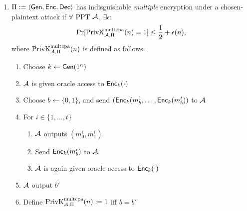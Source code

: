 \begin{solution}
\begin{enumerate}
    \item
      $\Pi := \langle\operatorname{\mathsf{Gen}}, \operatorname{\mathsf{Enc}}, \operatorname{\mathsf{Dec}}\rangle$ has indisguishable \emph{multiple} encryption under a chosen-plaintext attack
      if $\forall$ PPT $\mathcal{A}$, $\exists \epsilon$:
      \[ \Pr[\operatorname{PrivK}^{\text{multcpa}}_{\mathcal{A},\Pi}(n) = 1] \leq \frac{1}{2} + \epsilon(n), \]
      where $\operatorname{PrivK}^{\text{multcpa}}_{\mathcal{A},\Pi}(n)$ is defined as follows.
      \begin{enumerate}
        \item Choose $k \leftarrow \operatorname{\mathsf{Gen}}(1^n)$
        \item $\mathcal{A}$ is given oracle access to $\operatorname{\mathsf{Enc}}_k(\cdot)$
        \item Choose $b \leftarrow \{0,1\}$, and send $(\operatorname{\mathsf{Enc}}_k(m_b^1, \ldots, \operatorname{\mathsf{Enc}}_k(m_b^t))$ to $\mathcal{A}$
        \item For $i \in \{1, \ldots, t\}$
          \begin{enumerate}
            \item $\mathcal{A}$ outputs $(m_0^i, m_1^i)$
            \item Send $\operatorname{\mathsf{Enc}}_k(m_b^i)$ to $\mathcal{A}$
            \item $\mathcal{A}$ is again given oracle access to $\operatorname{\mathsf{Enc}}_k(\cdot)$
          \end{enumerate}
        \item $\mathcal{A}$ output $b'$
        \item Define $\operatorname{PrivK}^{\text{multcpa}}_{\mathcal{A},\Pi}(n) := 1$ iff $b = b'$
      \end{enumerate}
  \end{enumerate}
\end{solution}

